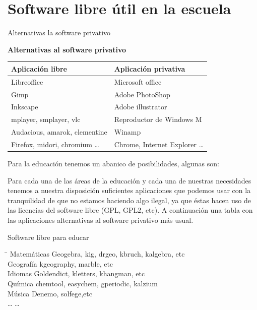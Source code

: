 \documentclass{beamer}
\begin{document}
\section{Software libre útil en la escuela}
\begin{frame}{Alternativas la software privativo}
\begin{center}
\textbf{Alternativas al software privativo}
\begin{tabular}{|l|l|}
\hline 
\textbf{Aplicación libre} & \textbf{Aplicación privativa }\\ 
\hline 
Libreoffice & Microsoft office \\ 
\hline 
Gimp & Adobe PhotoShop \\ 
\hline 
Inkscape & Adobe illustrator \\  
\hline 
mplayer, smplayer, vlc & Reproductor de Windows M \\ 
\hline 
Audacious, amarok, clementine & Winamp \\ 
\hline 
Firefox, midori, chromium \ldots & Chrome, Internet Explorer \ldots\\ 
\hline 
\end{tabular} 
\end{center}
\end{frame}
\begin{frame}
Para la educación tenemos un abanico de posibilidades, algunas son:

Para cada una de las áreas de la educación y cada una de nuestras necesidades tenemos a nuestra disposición suficientes aplicaciones que podemos usar con la tranquilidad de que no estamos haciendo algo ilegal, ya que éstas hacen uso de las licencias del software libre (GPL, GPL2, etc). A continuación una tabla con las aplicaciones alternativas al software privativo más usual.
\end{frame}
\begin{frame}{Software libre para educar}
\begin{tabbing}
\hspace{4cm}\=\kill
Matemáticas \> Geogebra, kig, drgeo, kbruch, kalgebra, etc \\ 
Geografía \> kgeography, marble, etc \\ 
Idiomas \> Goldendict, kletters, khangman, etc \\ 
Química \> chemtool, easychem, gperiodic, kalzium\\
Música \> Denemo, solfege,etc \\ 
\ldots \> \ldots
\end{tabbing} 
\end{frame}
\end{document}
